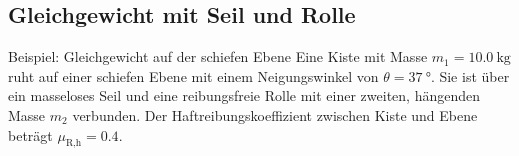 \subsection{Gleichgewicht mit Seil und Rolle}\label{subsec: gleichgewicht_seilrolle_schiefe_ebene}
\begin{examplebox}[lower separated=true, breakable]{Beispiel: Gleichgewicht auf der schiefen Ebene}
Eine Kiste mit Masse $m_1 = \SI{10.0}{\kilo\gram}$ ruht auf einer schiefen Ebene mit einem Neigungswinkel von $\theta = \SI{37}{\degree}$. Sie ist über ein masseloses Seil und eine reibungsfreie Rolle mit einer zweiten, hängenden Masse $m_2$ verbunden. Der Haftreibungskoeffizient zwischen Kiste und Ebene beträgt $\mu_\text{R,h} = 0.4$.\\
\begin{center}
\end{center}
\end{examplebox}

